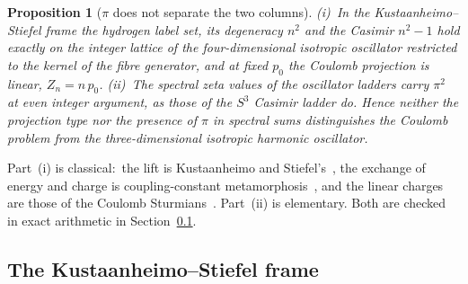 \documentclass[twocolumn,pra,amsmath,amssymb,superscriptaddress]{revtex4-2}
\newtheorem{proposition}{Proposition}
\begin{document}
\begin{proposition}[$\pi$ does not separate the two columns]
\label{thm:asymmetry}
(i)~In the Kustaanheimo--Stiefel frame the hydrogen label set, its
degeneracy $n^2$ and the Casimir $n^2 - 1$ hold exactly on the integer
lattice of the four-dimensional isotropic oscillator restricted to the
kernel of the fibre generator, and at fixed $p_0$ the Coulomb
projection is linear, $Z_n = n\,p_0$.  (ii)~The spectral zeta values
of the oscillator ladders carry $\pi^2$ at even integer argument, as
those of the $S^3$ Casimir ladder do.  Hence neither the projection
type nor the presence of $\pi$ in spectral sums distinguishes the
Coulomb problem from the three-dimensional isotropic harmonic
oscillator.
\end{proposition}

Part~(i) is classical:\ the lift is Kustaanheimo and
Stiefel's~\cite{kustaanheimo1965}, the exchange of energy and charge is
coupling-constant metamorphosis~\cite{hietarinta1984}, and the linear
charges are those of the Coulomb Sturmians~\cite{rotenberg1970}.
Part~(ii) is elementary.  Both are checked in exact arithmetic in
Section~\ref{sec:ks_frame}.

\subsection{The Kustaanheimo--Stiefel frame}
\label{sec:ks_frame}
\end{document}
